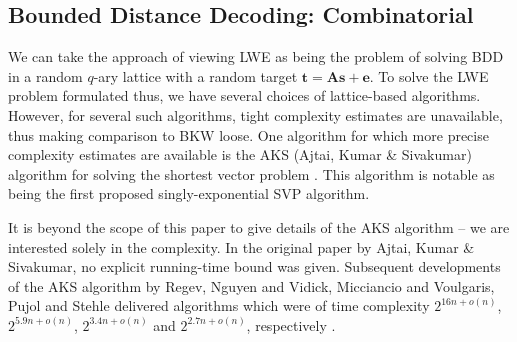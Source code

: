 \subsection{Bounded Distance Decoding: Combinatorial}
We can take the approach of viewing LWE as being the problem of solving BDD in a random $q$-ary lattice with a random target $\mathbf{t}=\mathbf{A}\mathbf{s}+\mathbf{e}$. To solve the LWE problem formulated thus, we have several choices of lattice-based algorithms. However, for several such algorithms, tight complexity estimates are unavailable, thus making comparison to BKW loose. One algorithm for which more precise complexity estimates are available is the AKS (Ajtai, Kumar \& Sivakumar) algorithm for solving the shortest vector problem \cite{ajtai-kumar-sivakumar:ccc2002}. This algorithm is notable as being the first proposed singly-exponential SVP algorithm.

It is beyond the scope of this paper to give details of the AKS algorithm -- we are interested solely in the complexity. In the original paper by Ajtai, Kumar \& Sivakumar, no explicit running-time bound was given. Subsequent developments of the AKS algorithm by Regev, Nguyen and Vidick, Micciancio and Voulgaris, Pujol and Stehle delivered algorithms which were of time complexity $2^{16n+o(n)}$, $2^{5.9n+o(n)}$, $2^{3.4n+o(n)}$ and $2^{2.7n+o(n)}$, respectively \cite{DBLP:conf/codcry/HanrotPS11}.